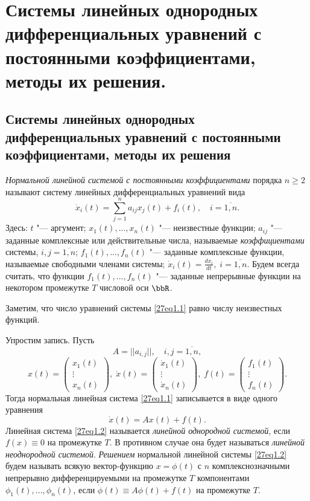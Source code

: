 \chapter{Системы линейных однородных дифференциальных уравнений с постоянными коэффициентами, методы их решения.}
\section{Системы линейных однородных дифференциальных уравнений с постоянными коэффициентами, методы их решения}
\begin{defn}\label{ch27defn1}
\textit{Нормальной линейной системой с постоянными коэффициентами} порядка $n\geq 2$ называют систему линейных дифференциальных уравнений вида
\begin{equation}\label{27eq1.1}
\dot x_i(t)=\sum\limits_{j=1}^n a_{ij}x_j(t)+f_i(t),\quad i=\overline{1,n}.
\end{equation}
Здесь: $t$ "--- аргумент; $x_1(t),...,x_n(t)$ "--- неизвестные функции; $a_{ij}$ "--- заданные комплексные или действительные числа, называемые \textit{коэффициентами} системы, $i,j=\overline{1,n}$; $f_1(t),...,f_n(t)$ "--- заданные комплексные функции, называемые свободными членами системы; $\dot x_i(t)=\frac{dx_i}{dt},\; i=\overline{1,n}$. Будем всегда считать, что функции $f_1(t),...,f_n(t)$ "--- заданные непрерывные функции на некотором промежутке $T$ числовой оси $\bbR$.
\end{defn}
Заметим, что число уравнений системы \eqref{27eq1.1} равно числу неизвестных функций.

Упростим запись. Пусть
$$
A=||a_{i,j}||,\quad i,j=\overline{1,n},
$$
$$
x(t)=\begin{pmatrix}
x_1(t)\\ \vdots \\ x_n(t)
\end{pmatrix},\;
\dot x(t)=\begin{pmatrix}
\dot x_1(t)\\ \vdots \\ \dot x_n(t)
\end{pmatrix},\;
f(t)=\begin{pmatrix}
f_1(t)\\ \vdots \\ f_n(t)
\end{pmatrix}.
$$
Тогда нормальная линейная система \eqref{27eq1.1} записывается в виде одного уравнения 
\begin{equation} \label{27eq1.2}
\dot x(t)=Ax(t)+f(t).
\end{equation}
Линейная система \eqref{27eq1.2} называется \textit{линейной однородной системой}, если $f(x)\equiv 0$ на промежутке $T$. В противном случае она будет называться \textit{линейной неоднородной системой}. \textit{Решением} нормальной линейной системы \eqref{27eq1.2} будем называть всякую вектор-функцию  $x=\phi(t)$ с $n$ комплекснозначными непрерывно дифференцируемыми на промежутке $T$ компонентами $\phi_1(t),...,\phi_n(t)$, если $\dot \phi(t)\equiv A\phi(t)+f(t)$ на промежутке $T$.

